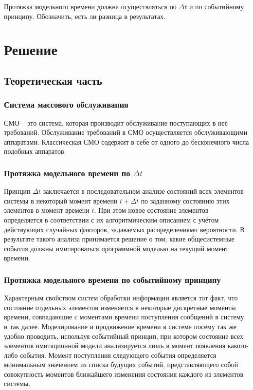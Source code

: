 \documentclass[14pt]{extreport}
\begin{document}
Протяжка модельного времени должна осуществляться по $\Delta t$ и по событийному принципу. Обозначить, есть ли разница в результатах. 



\chapter{Решение}
\section{Теоретическая часть}

\subsection{Система массового обслуживания}

СМО -- это система, которая производит обслуживание поступающих в неё требований. Обслуживание требований в СМО осуществляется обслуживающими аппаратами. Классическая СМО содержит в себе от одного до бесконечного числа подобных аппаратов.

\subsection{Протяжка модельного времени по $\Delta t$}

Принцип $\Delta t$ заключается в последовательном анализе состояний всех элементов системы в некоторый момент времени $t + \Delta t$ по заданному состоянию этих элементов в момент времени $t$. При этом новое состояние элементов определяется в соответствии с их алгоритмическим описанием с учётом действующих случайных факторов, задаваемых распределениями вероятности. В результате такого анализа принимается решение о том, какие общесистемные события должны имитироваться программной моделью на текущий момент времени.

\subsection{Протяжка модельного времени по событийному принципу}

Характерным свойством систем обработки информации является тот факт, что состояние отдельных элементов изменяется в некоторые дискретные моменты времени, совпадающие с моментами времени поступления сообщений в систему и так далее. Моделирование и продвижение времени в системе посему так же удобно проводить, используя событийный принцип, при котором состояние всех элементов имитационной модели анализируется лишь в момент появления какого-либо события. Момент поступления следующего события определяется минимальным значением из списка будущих событий, представляющего собой совокупность моментов ближайшего изменения состояния каждого из элементов системы.
\end{document}
